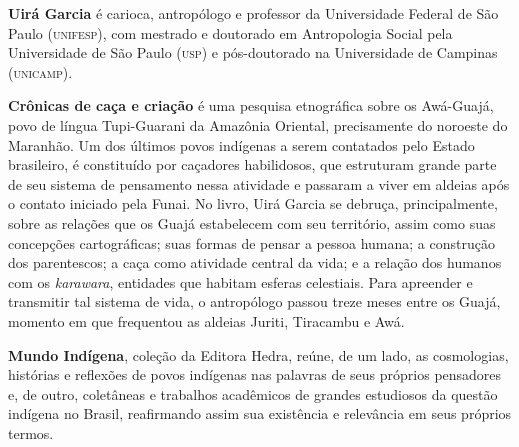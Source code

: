 \textbf{Uirá Garcia} é carioca, antropólogo e professor da Universidade Federal de São Paulo \textsc{(unifesp)}, com mestrado e doutorado em Antropologia Social pela Universidade de São Paulo \textsc{(usp)} e pós-doutorado na Universidade de Campinas \textsc{(unicamp)}. 

	
\textbf{Crônicas de caça e criação} é uma pesquisa etnográfica sobre os Awá-Guajá, povo de língua Tupi-Guarani da Amazônia Oriental, precisamente do noroeste do Maranhão. Um dos últimos povos indígenas a serem contatados pelo Estado brasileiro, é constituído por caçadores habilidosos, que estruturam grande parte de seu sistema de pensamento nessa atividade e passaram a viver em aldeias após o contato iniciado pela Funai. No livro, Uirá Garcia se debruça, principalmente, sobre as relações que os Guajá estabelecem com seu território, assim como suas concepções cartográficas; suas formas de pensar a pessoa humana; a construção dos parentescos; a caça como atividade central da vida; e a relação dos humanos com os \emph{karawara}, entidades que habitam esferas celestiais. Para apreender e transmitir tal sistema de vida, o antropólogo passou treze meses entre os Guajá, momento em que frequentou as aldeias Juriti, Tiracambu e Awá.


\textbf{Mundo Indígena}, coleção da Editora Hedra, reúne, de um lado, as cosmologias, histórias
e reflexões de povos indígenas nas palavras de seus próprios pensadores e, de outro, coletâneas
e trabalhos acadêmicos de grandes estudiosos da questão indígena no Brasil, reafirmando assim sua
existência e relevância em seus próprios termos.\par